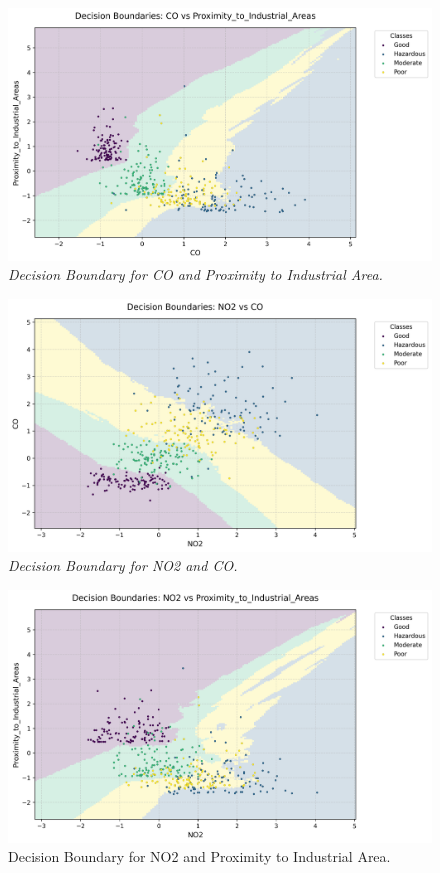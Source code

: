 \documentclass[10pt,twocolumn]{article}
\begin{document}
\begin{figure}[h!]
    \centering
    \includegraphics[width=\linewidth]{CO_Proximity_to_Industrial_Areas.png}
    \caption{\textit{Decision Boundary for CO and Proximity to Industrial Area.}}
    \label{fig:CO_Proximity}
\end{figure}

\begin{figure}[h!]
    \centering
    \includegraphics[width=\linewidth]{NO2_CO.png}
    \caption{\textit{Decision Boundary for NO2 and CO.}}
    \label{fig:NO2_CO}
\end{figure}

\begin{figure}[h!]
    \centering
    \includegraphics[width=\linewidth]{NO2_Proximity_to_Industrial_Areas.png}
    \caption{{Decision Boundary for NO2 and Proximity to Industrial Area.}}
    \label{fig:NO2_Proximity}
\end{figure}
\end{document}

